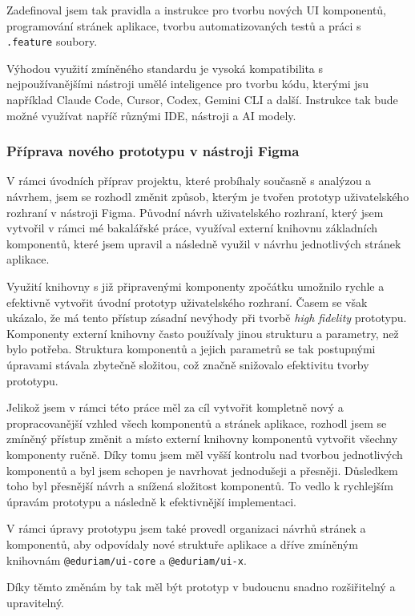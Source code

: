 Zadefinoval jsem tak pravidla a instrukce pro tvorbu nových UI komponentů, programování stránek aplikace, tvorbu automatizovaných testů a práci s \texttt{.feature} soubory.

Výhodou využití zmíněného standardu je vysoká kompatibilita s nejpoužívanějšími nástroji umělé inteligence pro tvorbu kódu, kterými jsu například Claude Code, Cursor, Codex, Gemini CLI a další. Instrukce tak bude možné využívat napříč různými IDE, nástroji a AI modely.

\subsubsection{Příprava nového prototypu v nástroji Figma}

V rámci úvodních příprav projektu, které probíhaly současně s analýzou a návrhem, jsem se rozhodl změnit způsob, kterým je tvořen prototyp uživatelského rozhraní v nástroji Figma. Původní návrh uživatelského rozhraní, který jsem vytvořil v rámci mé bakalářské práce, využíval externí knihovnu základních komponentů, které jsem upravil a následně využil v návrhu jednotlivých stránek aplikace.

Využití knihovny s již připravenými komponenty zpočátku umožnilo rychle a efektivně vytvořit úvodní prototyp uživatelského rozhraní. Časem se však ukázalo, že má tento přístup zásadní nevýhody při tvorbě \textit{high fidelity} prototypu. Komponenty externí knihovny často používaly jinou strukturu a parametry, než bylo potřeba. Struktura komponentů a jejich parametrů se tak postupnými úpravami stávala zbytečně složitou, což značně snižovalo efektivitu tvorby prototypu.

Jelikož jsem v rámci této práce měl za cíl vytvořit kompletně nový a propracovanější vzhled všech komponentů a stránek aplikace, rozhodl jsem se zmíněný přístup změnit a místo externí knihovny komponentů vytvořit všechny komponenty ručně. Díky tomu jsem měl vyšší kontrolu nad tvorbou jednotlivých komponentů a byl jsem schopen je navrhovat jednodušeji a přesněji. Důsledkem toho byl přesnější návrh a snížená složitost komponentů. To vedlo k rychlejším úpravám prototypu a následně k efektivnější implementaci.

V rámci úpravy prototypu jsem také provedl organizaci návrhů stránek a komponentů, aby odpovídaly nové struktuře aplikace a dříve zmíněným knihovnám \texttt{@eduriam/ui-core} a \texttt{@eduriam/ui-x}.

Díky těmto změnám by tak měl být prototyp v budoucnu snadno rozšiřitelný a upravitelný. 
